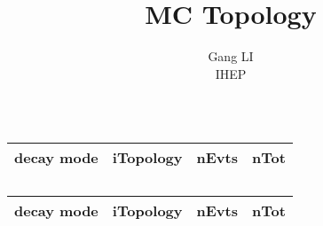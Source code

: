 \documentclass[11pt]{article}
\begin{document}
\title{MC Topology}
\author{Gang LI\\
\small{ IHEP}}
\maketitle

\begin{table}[htbp] 
\begin{center}
\begin{small}
\begin{tabular}{llll}\hline\hline
 decay mode &   iTopology & nEvts & nTot \\\hline



\hline\hline
\end{tabular}
\end{small}
\caption{ }
\end{center}
\end{table}

\begin{table}[htbp] 
\begin{center}
\begin{small}
\begin{tabular}{llll}\hline\hline
 decay mode &   iTopology & nEvts & nTot \\\hline



\hline\hline
\end{tabular}
\end{small}
\caption{ }
\end{center}
\end{table}
\end{document}
